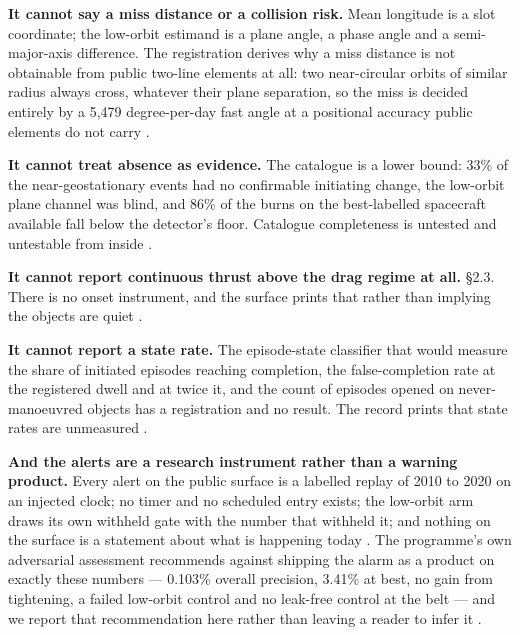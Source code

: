 \documentclass[11pt]{article}
\begin{document}
\textbf{It cannot say a miss distance or a collision risk.} Mean longitude is a slot coordinate; the low-orbit estimand is a plane angle, a phase angle and a semi-major-axis difference. The registration derives why a miss distance is not obtainable from public two-line elements at all: two near-circular orbits of similar radius always cross, whatever their plane separation, so the miss is decided entirely by a 5,479 degree-per-day fast angle at a positional accuracy public elements do not carry%
.

\textbf{It cannot treat absence as evidence.} The catalogue is a lower bound: 33\% of the near-geostationary events had no confirmable initiating change, the low-orbit plane channel was blind, and 86\% of the burns on the best-labelled spacecraft available fall below the detector's floor. Catalogue completeness is untested and untestable from inside%
.

\textbf{It cannot report continuous thrust above the drag regime at all.} \S{}2.3. There is no onset instrument, and the surface prints that rather than implying the objects are quiet%
.

\textbf{It cannot report a state rate.} The episode-state classifier that would measure the share of initiated episodes reaching completion, the false-completion rate at the registered dwell and at twice it, and the count of episodes opened on never-manoeuvred objects has a registration and no result. The record prints that state rates are unmeasured%
.

\textbf{And the alerts are a research instrument rather than a warning product.} Every alert on the public surface is a labelled replay of 2010 to 2020 on an injected clock; no timer and no scheduled entry exists; the low-orbit arm draws its own withheld gate with the number that withheld it; and nothing on the surface is a statement about what is happening today%
. The programme's own adversarial assessment recommends against shipping the alarm as a product on exactly these numbers --- 0.103\% overall precision, 3.41\% at best, no gain from tightening, a failed low-orbit control and no leak-free control at the belt --- and we report that recommendation here rather than leaving a reader to infer it%
.
\end{document}
